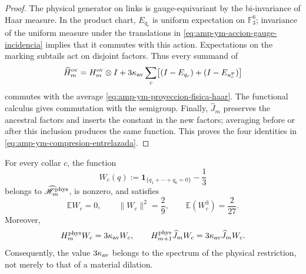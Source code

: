 \begin{proof}
The physical generator on links is gauge-equivariant by the
bi-invariance of Haar measure. In the product chart, \(E_{q_c}\) is uniform
expectation on \(\mathbb F_3^6\); invariance of the uniform measure under
the translations in \eqref{eq:amp-ym-accion-gauge-incidencia} implies that it commutes with
this action. Expectations on the marking subtails act on
disjoint factors. Thus every summand of
\[
 \widehat H_m^{\rm ov}
 =H_m^{\rm ov}\otimes I
 +3\kappa_{\rm av}\sum_c
 \bigl[(I-E_{q_c})+(I-E_{u_c^{\rm P}})\bigr]
\]
commutes with the average \eqref{eq:amp-ym-proyeccion-fisica-haar}. The
functional calculus gives commutation with the semigroup. Finally,
\(\widehat J_m\) preserves the ancestral factors and inserts the constant
in the new factors; averaging before or after this inclusion produces
the same function. This proves the four identities in
\eqref{eq:amp-ym-compresion-entrelazada}.
\end{proof}

\begin{lemma}
\label{lem:amp-ym-testigo-fisico-q6}
For every collar \(c\), the function
\begin{equation}\label{eq:amp-ym-testigo-fisico-def}
 W_c(q)
 :=\mathbf 1_{\{q_1+\cdots+q_6=0\}}-\frac13
\end{equation}
belongs to \(\widehat{\mathscr H}_m^{\rm phys}\), is nonzero, and satisfies
\begin{equation}\label{eq:amp-ym-testigo-fisico-momentos}
 \mathbb E W_c=0,\qquad
 \|W_c\|^2=\frac29,\qquad
 \mathbb E(W_c^3)=\frac2{27}.
\end{equation}
Moreover,
\begin{equation}\label{eq:amp-ym-testigo-fisico-gap}
 H_m^{\rm phys}W_c=3\kappa_{\rm av}W_c,\qquad
 H_{m+1}^{\rm phys}\widehat J_mW_c
 =3\kappa_{\rm av}\widehat J_mW_c.
\end{equation}
Consequently, the value \(3\kappa_{\rm av}\) belongs to the spectrum of the
physical restriction, not merely to that of a material dilation.
\end{lemma}

